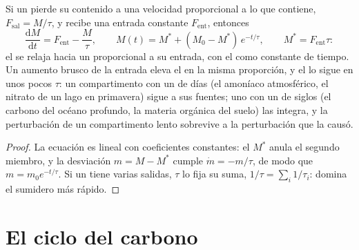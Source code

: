 \begin{theorem}\label{thm:b2:biogeochemical-cycles:box}
Si un  pierde su contenido a una velocidad proporcional a lo que
contiene, $F_{\text{sal}} = M/\tau$, y recibe una entrada constante
$F_{\text{ent}}$, entonces
\[
\frac{\mathrm{d}M}{\mathrm{d}t} = F_{\text{ent}} - \frac{M}{\tau},
\qquad
M(t) = M^{*} + (M_0 - M^{*})\,e^{-t/\tau}, \qquad M^{*} = F_{\text{ent}}\tau :
\]
el  se relaja hacia un  proporcional a su
entrada, con el  como constante de tiempo. Un aumento
brusco de la entrada eleva el  en la misma proporción,
y el  lo sigue en unos pocos $\tau$: un compartimento con un
 de días (el amoníaco atmosférico, el nitrato de un
lago en primavera) sigue a sus fuentes; uno con un  de
siglos (el carbono del océano profundo, la materia orgánica del suelo) las
integra, y la perturbación de un compartimento lento sobrevive a la
perturbación que la causó.
\end{theorem}
\begin{proof}
La ecuación es lineal con coeficientes constantes: el 
$M^{*}$ anula el segundo miembro, y la desviación $m = M - M^{*}$
cumple $\dot m = -m/\tau$, de modo que $m = m_0 e^{-t/\tau}$. Si un
 tiene varias salidas, $\tau$ lo fija su suma, $1/\tau = \sum_i
1/\tau_i$: domina el sumidero más rápido.
\end{proof}

\section{El ciclo del carbono}

